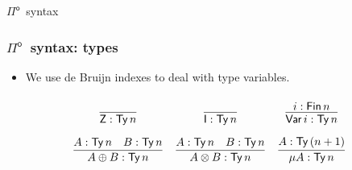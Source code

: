 \documentclass[12pt,t]{beamer}
\newcommand{\Pio}{\ensuremath{\mathsf{\Pi}^{\mathsf{o}}}}
\newcommand{\Ty}{\mathsf{Ty}}
\newcommand{\Var}{\mathsf{Var}}
\newcommand{\Z}{\mathsf{Z}}
\newcommand{\I}{\mathsf{I}}
\begin{document}
\begin{frame}[c]
  \begin{center}
    \Huge \Pio\ syntax
  \end{center}
\end{frame}


\begin{frame}
  
  \frametitle{\Pio\ syntax: types}
  \begin{itemize}
    \item We use de Bruijn indexes to deal with type variables.
  \end{itemize}
  \[
  \arraycolsep=6pt\def\arraystretch{2.8}
  \begin{array}{ccc}
    \infer{\Z : \Ty\,n}{} 
    & \infer{\I : \Ty\,n}{}
    & \infer{\Var\,i : \Ty\,n}{i : \mathsf{Fin}\,n}  \\
    \infer{A \oplus B : \Ty\,n}{A : \Ty\,n & B : \Ty\,n}
    & \infer{A \otimes B : \Ty\,n}{A : \Ty\,n & B : \Ty\,n}
    & \infer{\mu A : \Ty\,n}{A : \Ty\,(n+1)}
  \end{array}
  \]
  
\end{frame}
\end{document}
